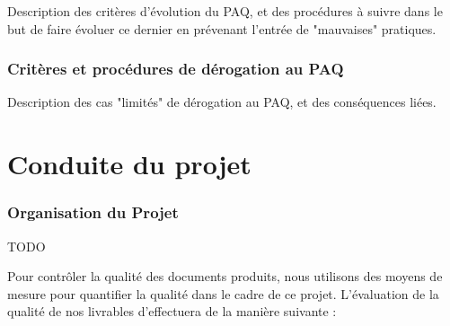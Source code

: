 \documentclass[a4paper, 18pt]{article}
\begin{document}
Description des critères d'évolution du PAQ, et des procédures à suivre dans le but de faire évoluer ce dernier en prévenant l'entrée de "mauvaises" pratiques.

\section{Critères et procédures de dérogation au PAQ}

Description des cas "limités" de dérogation au PAQ, et des conséquences liées.

%
%
%
%
%
%
%
%

\part{Conduite du projet}

\section{Organisation du Projet}

TODO

Pour contrôler la qualité des documents produits, nous utilisons des moyens de mesure pour quantifier la qualité dans le cadre de ce projet. L'évaluation de la qualité de nos livrables d'effectuera de la manière suivante :
\end{document}
